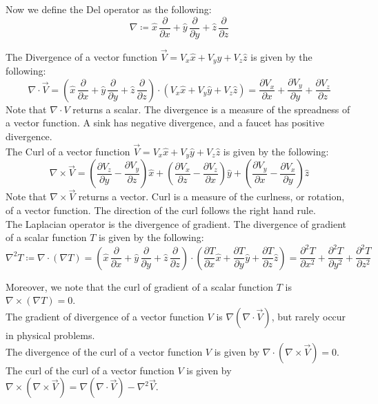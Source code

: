 \documentclass[11pt,oneside]{book}
\theoremstyle{break}
\theoremstyle{break}
\newcommand{\pd}{\partial}
\begin{document}
Now we define the Del operator as the following:
$$\nabla \coloneqq \hat{x}\,\frac{\pd}{\pd x} + \hat{y} \,\frac{\pd}{\pd y}+ \hat{z}\,\frac{\pd}{\pd z}$$

The Divergence of a vector function $\vec{V} =  V_x \hat{x} + V_y \hat{y} + V_z \hat{z}$ is given by the following:
$$\nabla \cdot \vec{V} = \left(\hat{x}\,\frac{\pd}{\pd x} + \hat{y} \,\frac{\pd}{\pd y}+ \hat{z}\,\frac{\pd}{\pd z}\right) \cdot \left( V_x \hat{x} + V_y \hat{y} + V_z \hat{z}\right) = \frac{\pd V_x}{\pd x} + \frac{\pd V_y}{\pd y}+ \frac{\pd V_z}{\pd z}$$
Note that $\nabla \cdot V$ returns a scalar. The divergence is a measure of the spreadness of a vector function. A sink has negative divergence, and a faucet has positive divergence. \\

The Curl of a vector function $\vec{V} =  V_x \hat{x} + V_y \hat{y} + V_z \hat{z}$ is given by the following:
$$\nabla \times \vec{V} = \left( \frac{\pd V_z}{\pd y} - \frac{\pd V_y}{\pd z}\right) \hat{x} + \left( \frac{\pd V_x}{\pd z} - \frac{\pd V_z}{\pd x}\right) \hat{y} + \left( \frac{\pd V_y}{\pd x} - \frac{\pd V_x}{\pd y}\right) \hat{z}$$
Note that $\nabla \times \vec{V}$ returns a vector. Curl is a measure of the curlness, or rotation, of a vector function. The direction of the curl follows the right hand rule.\\

The Laplacian operator is the divergence of gradient. The divergence of gradient of a scalar function $T$ is given by the following:
$$\nabla^2 T \coloneqq \nabla \cdot (\nabla T) = \left(\hat{x}\,\frac{\pd}{\pd x} + \hat{y} \,\frac{\pd}{\pd y}+ \hat{z}\,\frac{\pd}{\pd z}\right) \cdot \left( \frac{\pd T}{\pd x}\hat{x} + \frac{\pd T}{\pd y}\hat{ y} + \frac{\pd T}{\pd z}\hat{z}\right) = \frac{\pd^2 T}{\pd x^2} +  \frac{\pd^2 T}{\pd y^2} + \frac{\pd^2 T}{\pd z^2}$$

Moreover, we note that the curl of gradient of a scalar function $T$ is $\nabla \times (\nabla T) = 0$.\\ 
The gradient of divergence of a vector function $V$ is $\nabla (\nabla \cdot \vec{V})$, but rarely occur in physical problems. \\
The divergence of the curl of a vector function $V$ is given by $\nabla \cdot (\nabla \times \vec{V}) = 0$. \\
The curl of the curl of a vector function $V$ is given by $\nabla \times (\nabla \times \vec{V}) = \nabla ( \nabla \cdot \vec{V}) - \nabla^2 \vec{V}$. \\
\end{document}
